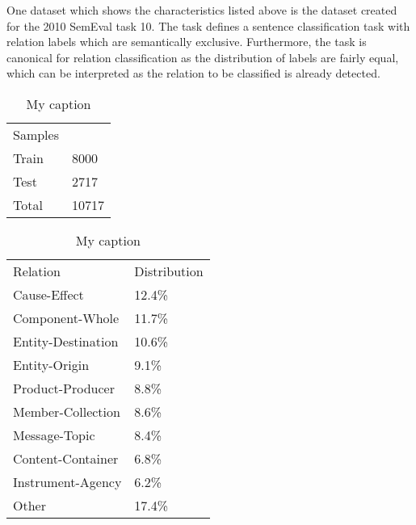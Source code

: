 One dataset which shows the characteristics listed above is the dataset created for the 2010 SemEval task 10\cite{semeval2010}. The task defines a sentence classification task with relation labels which are semantically exclusive. Furthermore, the task is canonical for relation classification as the distribution of labels are fairly equal, which can be interpreted as the relation to be classified is already detected. 

\begin{table}
\parbox{.45\linewidth}{
\centering
\caption{My caption}
\label{my-label}
\begin{tabular}{ll}
Samples &       \\
Train   & 8000  \\
Test    & 2717  \\
Total   & 10717
\end{tabular}
}
\hfill
\parbox{.45\linewidth}{
\centering
\caption{My caption}
\label{my-label}
\begin{tabular}{ll}
Relation           & Distribution \\
Cause-Effect       & 12.4\%       \\
Component-Whole    & 11.7\%       \\
Entity-Destination & 10.6\%       \\
Entity-Origin      & 9.1\%        \\
Product-Producer   & 8.8\%        \\
Member-Collection  & 8.6\%        \\
Message-Topic      & 8.4\%        \\
Content-Container  & 6.8\%        \\
Instrument-Agency  & 6.2\%        \\
Other              & 17.4\%      
\end{tabular}
}
\end{table}

